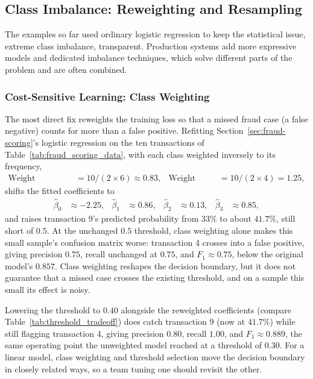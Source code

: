 \documentclass[../ai_in_finance]{subfiles}
\begin{document}
\subsection{Class Imbalance: Reweighting and Resampling}
\label{sec:advanced-imbalance}

The examples so far used ordinary logistic regression to keep the statistical issue, extreme class imbalance, transparent. Production systems add more expressive models and dedicated imbalance techniques, which solve different parts of the problem and are often combined.

\subsubsection*{Cost-Sensitive Learning: Class Weighting}

The most direct fix reweights the training loss so that a missed fraud case (a false negative) counts for more than a false positive. Refitting Section~\ref{sec:fraud-scoring}'s logistic regression on the ten transactions of Table~\ref{tab:fraud_scoring_data}, with each class weighted inversely to its frequency,
\begin{align*}
\text{Weight (legitimate)} &= 10/(2\times6) \approx 0.83, & \text{Weight (fraud)} &= 10/(2\times4) = 1.25,
\end{align*}
shifts the fitted coefficients to
\begin{align*}
\hat\beta_0 &\approx -2.25, & \hat\beta_1 &\approx 0.86, & \hat\beta_2 &\approx 0.13, & \hat\beta_3 &\approx 0.85,
\end{align*}
and raises transaction 9's predicted probability from $33\%$ to about $41.7\%$, still short of $0.5$. At the unchanged $0.5$ threshold, class weighting alone makes this small sample's confusion matrix worse: transaction 4 crosses into a false positive, giving precision $0.75$, recall unchanged at $0.75$, and $F_1\approx0.75$, below the original model's $0.857$. Class weighting reshapes the decision boundary, but it does not guarantee that a missed case crosses the existing threshold, and on a sample this small its effect is noisy.

Lowering the threshold to $0.40$ alongside the reweighted coefficients (compare Table~\ref{tab:threshold_tradeoff}) does catch transaction 9 (now at $41.7\%$) while still flagging transaction 4, giving precision $0.80$, recall $1.00$, and $F_1\approx0.889$, the same operating point the unweighted model reached at a threshold of $0.30$. For a linear model, class weighting and threshold selection move the decision boundary in closely related ways, so a team tuning one should revisit the other.
\end{document}
